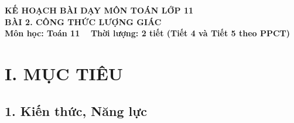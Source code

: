\documentclass[12pt, a4paper]{article}
\begin{document}
\begin{center}
    {\fontsize{14pt}{17pt}\selectfont \textbf{KẾ HOẠCH BÀI DẠY MÔN TOÁN LỚP 11}}\\[6pt]
    {\fontsize{16pt}{19pt}\selectfont \textbf{BÀI 2. CÔNG THỨC LƯỢNG GIÁC}}\\[4pt]
    {\fontsize{12pt}{15pt}\selectfont \textbf{Môn học: Toán 11} \ \textbar \ \textbf{Thời lượng: 2 tiết (Tiết 4 và Tiết 5 theo PPCT)}}
\end{center}

\vspace{5pt}

\section*{I. MỤC TIÊU}

\subsection*{1. Kiến thức, Năng lực}
\end{document}
